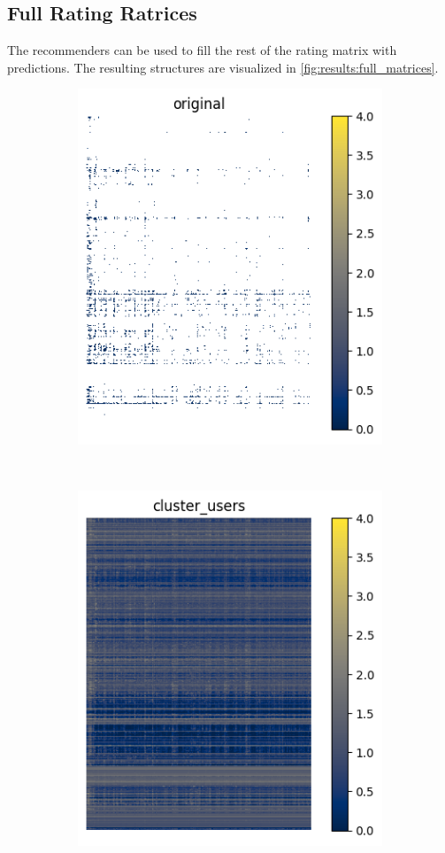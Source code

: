 \documentclass[sigconf]{acmart}
\begin{document}
\subsection{Full Rating Ratrices}
\label{sec:results:full_matrix}
The recommenders can be used to fill the rest of the rating matrix with predictions. The resulting structures are visualized in \autoref{fig:results:full_matrices}.
\begin{figure}[!htb]
	\begin{subfigure}{0.2\textwidth}
		\centering
		\includegraphics[scale=0.4]{matrix_original.png}
	\end{subfigure}
	\hfill\\
	\begin{subfigure}{0.2\textwidth}
		\centering
		\includegraphics[scale=0.4]{matrix_cluster_users.png}

\end{subfigure}
\end{figure}
\end{document}
